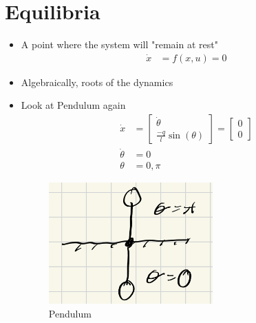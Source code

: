 \documentclass[11pt]{article}
\begin{document}
\section{Equilibria}
\begin{itemize}
    \item A point where the system will "remain at rest"
    \begin{align*}
        \dot{x} &= f(x,u) = 0
    \end{align*}
    \item Algebraically, roots of the dynamics
    \item Look at Pendulum again
    \begin{align*}
        \dot{x} &= \begin{bmatrix}
            \dot{\theta} \\
            \frac{-q}{l}\sin(\theta)
        \end{bmatrix}
        =
        \begin{bmatrix}
            0 \\
            0
        \end{bmatrix}
        \\
        \dot{\theta} &= 0
        \\
        \theta &= 0,\pi
    \end{align*}
    \begin{figure}[H]
        \centering
        \includegraphics[width=0.4\linewidth]{lecture_2_1.png}
        \caption{Pendulum}
        \label{pendulum1}
    \end{figure}
\end{itemize}
\end{document}
